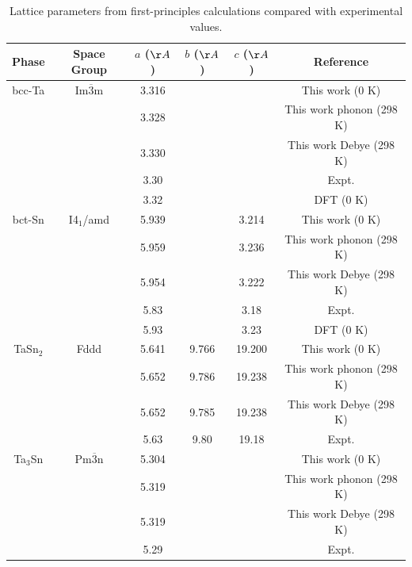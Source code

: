 \begin{table}[H]
	\caption{Lattice parameters from first-principles calculations compared with experimental values.}
	\centering
	\begin{tabular}{ c c c c c c }
		\hline
		Phase & Space Group & $a$ ($\AA$) & $b$ ($\AA$)  & $c$ ($\AA$) & Reference\\
		\hline
		bcc-Ta & Im$\overline{3}$m & 3.316 & & &This work (0 K)\\
		            &                             & 3.328 & & & This work phonon (298 K)\\
		            &                             & 3.330 & & & This work Debye (298 K)\\
		            &                             & 3.30   & & & Expt. \cite{Predmore1970}\\
		            &                             & 3.32   & & & DFT (0 K) \cite{Shang2010b}\\
		bct-Sn & I4$_1$/amd & 5.939 & & 3.214 & This work (0 K)\\
		            &                   & 5.959 & & 3.236 & This work phonon (298 K)\\
		            &                   & 5.954 & & 3.222 & This work Debye (298 K)\\
		            &                   & 5.83   & & 3.18 & Expt. \cite{Allen1991}\\
		            &                   & 5.93   & & 3.23 & DFT (0 K) \cite{Arroyave2006a}\\
         TaSn$_2$ & Fddd & 5.641 & 9.766 & 19.200 & This work (0 K)\\
              &          & 5.652 & 9.786 & 19.238 & This work phonon (298 K)\\
              &          & 5.652 & 9.785 & 19.238 & This work Debye (298 K)\\
                         &          & 5.63 & 9.80 & 19.18 & Expt. \cite{Calvert1991}\\
          Ta$_3$Sn & Pm$\overline{3}$n & 5.304 & & &This work (0 K)\\
                          &                   & 5.319 & & & This  work phonon (298 K)\\
                          &                   & 5.319 & & & This work Debye (298 K)\\
                          &                   & 5.29 & & & Expt. \cite{Courtney1965}\\
		\hline
	\end{tabular}
	\label{Ch4-table:TaSnlattice}
\end{table}
\clearpage

